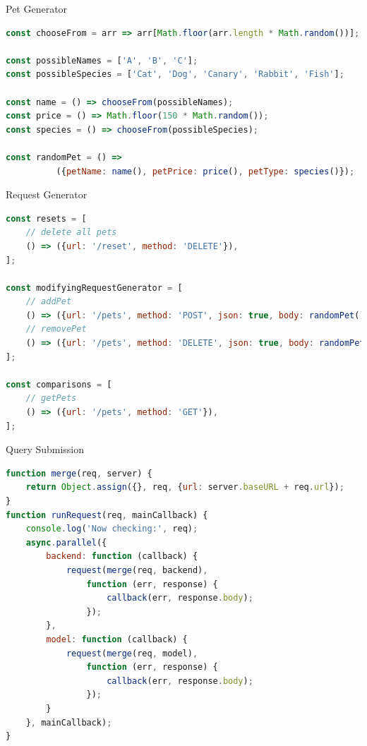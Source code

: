 \begin{frame}[fragile]{Pet Generator}

\begin{lstlisting}[language=JavaScript]
const chooseFrom = arr => arr[Math.floor(arr.length * Math.random())];

const possibleNames = ['A', 'B', 'C'];
const possibleSpecies = ['Cat', 'Dog', 'Canary', 'Rabbit', 'Fish'];

const name = () => chooseFrom(possibleNames);
const price = () => Math.floor(150 * Math.random());
const species = () => chooseFrom(possibleSpecies);

const randomPet = () => 
          ({petName: name(), petPrice: price(), petType: species()});
\end{lstlisting}

\end{frame}

\begin{frame}[fragile]{Request Generator}

\begin{lstlisting}[language=JavaScript]
const resets = [
    // delete all pets
    () => ({url: '/reset', method: 'DELETE'}),
];

const modifyingRequestGenerator = [
    // addPet
    () => ({url: '/pets', method: 'POST', json: true, body: randomPet()}),
    // removePet
    () => ({url: '/pets', method: 'DELETE', json: true, body: randomPet()})
];

const comparisons = [
    // getPets
    () => ({url: '/pets', method: 'GET'}),
];
\end{lstlisting}

\end{frame}

\begin{frame}[fragile]{Query Submission}

\begin{lstlisting}[language=JavaScript]
function merge(req, server) {
    return Object.assign({}, req, {url: server.baseURL + req.url});
}
function runRequest(req, mainCallback) {
    console.log('Now checking:', req);
    async.parallel({
        backend: function (callback) {
            request(merge(req, backend),
                function (err, response) {
                    callback(err, response.body);
                });
        },
        model: function (callback) {
            request(merge(req, model),
                function (err, response) {
                    callback(err, response.body);
                });
        }
    }, mainCallback);
}
\end{lstlisting}

\end{frame}


